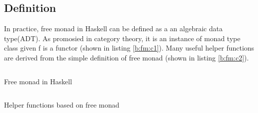 \subsection{Definition}
In practice, free monad in Haskell can be defined as a an algebraic data type(ADT). As promosied in category theory, it is an instance of monad type class given f is a functor (shown in listing \ref{b:fm:c1}). Many useful helper functions are derived from the simple definition of free monad (shown in listing \ref{b:fm:c2}).
\begin{listing}[ht]
  \inputminted{haskell}{background/fm-construction.hs}
  \caption{Free monad in Haskell}
  \label{b:fm:c1}
\end{listing}
\begin{listing}[ht]
  \inputminted{haskell}{background/fm-helper.hs}
  \caption{Helper functions based on free monad}
  \label{b:fm:c2}
\end{listing}

